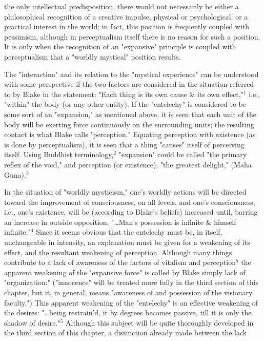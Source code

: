 \noindent the only intellectual predisposition, there would not necessarily be either a philosophical recognition of a creative impulse, physical
or psychological, or a practical interest in the world; in fact, this position is frequently coupled with pessimism, although in
perceptualism itself there is no reason for such a position. It is only when the recognition of an "expansive" principle is
coupled with perceptualism that a "worldly mystical" position results.\par
\vspace*{0.5\baselineskip}
The "interaction" and its relation to the "mystical experience" can be understood with some perspective if the two factors
are considered in the situation referred to by Blake in the statement: "Each thing is its own cause \& its own effect,"$^{1}$ i.e., "within" the body (or any other entity). If the
"entelechy" is considered to be some sort of an "expansion," as mentioned above, it is seen that each unit of the body will be exerting force continuously on the surrounding
units; the resulting contact is what Blake calls "perception." Equating perception with existence (as is done by perceptualism), it is seen that a thing
"causes" itself of perceiving itself. Using Buddhist terminology,$^{2}$ "expansion" could be called "the primary reflex of the void," and perception (or existence), "the greatest delight," (Maha Guna).$^{3}$\par
In the situation of "worldly mysticism," one's worldly actions will be directed toward the improvement of consciousness, on all levels, and
one's consciousness, i.e., one's existence, will be (according to Blake's beliefs) increased until, barring an increase in outside opposition, "\dots Man's
possession is infinite \& himself infinite."$^{4}$ Since it seems obvious that the entelechy must be, in itself, unchangeable
in intensity, an explanation must be given for a weakening of its effect, and the resultant weakening of perception. Although
many things contribute to a lack of awareness of the factors of vitalism and perception$^{5}$ the apparent weakening of the "expansive force" is called
by Blake simply lack of "organization:" ("innocence" will be treated more fully
in the third section of this chapter, but it, in general, means "awareness of and possession of the visionary faculty.")
This apparent weakening of the "entelechy" is an effective weakening of the desires: "\dots being restrain'd, it by degrees becomes passive, till it is only the shadow of desire."$^{5}$
Although this subject will be quite thoroughly developed in the third section of this chapter, a distinction already made between the lack
